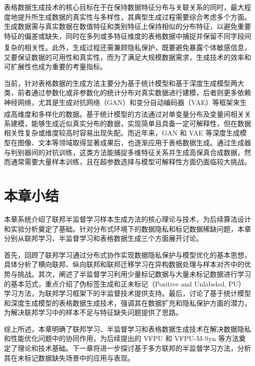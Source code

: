 表格数据生成技术的核心目标在于在保持数据特征分布与关联关系的同时，最大程度地提升所生成数据的真实性与多样性，其典型生成过程需要综合考虑多个方面。生成数据需与真实数据在数值特征和类别特征上保持相似的分布特征，以避免重要特征的偏差或缺失，同时在多列或多特征维度的表格数据中捕捉并保留不同字段间复杂的相关性\textsuperscript{\cite{zhang2020tab}}。此外，生成过程还需兼顾隐私保护，既要避免暴露个体敏感信息，又要保证数据的可用性和真实性，而为了满足大规模数据需求，生成技术的效率和可扩展性也成为重要的考量指标。

当前，针对表格数据的生成方法主要分为基于统计模型和基于深度生成模型两大类，前者通过参数化或非参数化的统计分布对真实数据进行建模，后者则更多依赖神经网络，尤其是生成对抗网络（GAN）和变分自动编码器（VAE）等框架来生成高维度和多样化的数据\textsuperscript{\cite{brown2019differential}}。基于统计模型的方法通过对单变量分布及变量间相关关系建模，能够生成近似真实分布的数据，实现简单且具备一定可解释性，但在数据相关性复杂或维度较高时容易出现失配。而近年来，GAN 和 VAE 等深度生成模型在图像、文本等领域取得显著成果后，也逐渐应用于表格数据生成。通过生成器与判别器间的对抗训练，这类方法能捕捉多维特征关系并生成高保真合成数据，然而通常需要大量样本训练，且在超参数选择与模型可解释性方面仍面临较大挑战。

\section{本章小结}
本章系统介绍了联邦半监督学习样本生成方法的核心理论与技术，为后续算法设计和实验分析奠定了基础。针对分布式环境下的数据隐私和标记数据稀缺问题，本章分别从联邦学习、半监督学习和表格数据生成三个方面展开讨论。

首先，回顾了联邦学习通过分布式协作实现数据隐私保护与模型优化的基本思想，具体分析了横向联邦、纵向联邦和联邦迁移学习在异构数据处理与样本对齐中的优势与挑战。其次，阐述了半监督学习利用少量标记数据与大量未标记数据进行学习的基本范式，重点介绍了伪标签生成和正未标记（Positive and Unlabeled, PU）学习方法，为联邦学习框架下的半监督技术提供支持。最后，讨论了基于统计模型和深度生成模型的表格数据生成技术，强调其在数据扩充和隐私保护方面的潜力，为解决联邦学习中的样本不足与特征缺失问题提供了思路。

综上所述，本章明确了联邦学习、半监督学习和表格数据生成技术在解决数据隐私和性能优化问题中的协同作用，为后续提出的 VFPU 和 VFPU-M-Syn 等方法奠定了理论和技术基础。下一章将进一步探讨基于多方联邦的半监督学习方法，分析其在未标记数据缺失场景中的应用与表现。

